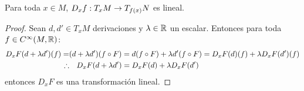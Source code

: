 \begin{ejercicio}\label{ej:23}
  Para toda $x\in M$, $D_xf:T_x M\rightarrow T_{f(x)}N$ es lineal.
\end{ejercicio}

\begin{proof}%
  Sean $d,d'\in T_x M$ derivaciones y $\lambda\in\mathbb{R}$ un escalar. Entonces para toda $f\in C^{\infty}(M,\mathbb{R})$:
  \begin{align*}
    D_xF(d+\lambda d')(f) =& (d+\lambda d')(f\circ F)=d(f\circ F)+\lambda d'(f\circ F)=D_xF(d)(f)+\lambda D_xF(d')(f)\\
    \therefore &\quad D_xF(d+\lambda d')=D_xF(d)+\lambda D_xF(d')
  \end{align*}
  entonces $D_x F$ es una transformaci\'on lineal.  
\end{proof}%

